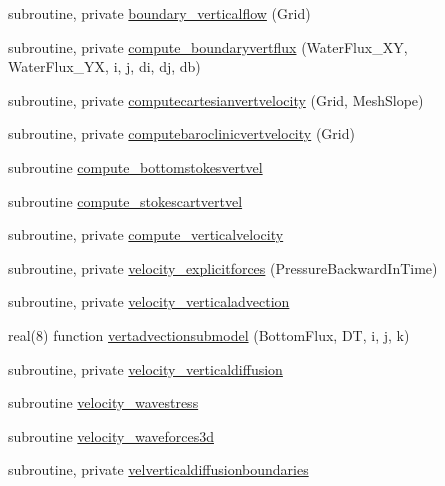 \begin{DoxyCompactItemize}
\item 
subroutine, private \mbox{\hyperlink{namespacemodulehydrodynamic_a08186b721c96e023d8a58a34dc22522f}{boundary\+\_\+verticalflow}} (Grid)
\item 
subroutine, private \mbox{\hyperlink{namespacemodulehydrodynamic_a6bae766b43109e13a0a6976d688327fe}{compute\+\_\+boundaryvertflux}} (Water\+Flux\+\_\+\+XY, Water\+Flux\+\_\+\+YX, i, j, di, dj, db)
\item 
subroutine, private \mbox{\hyperlink{namespacemodulehydrodynamic_a6063cff17a8575e5ea95e38e9a14da2d}{computecartesianvertvelocity}} (Grid, Mesh\+Slope)
\item 
subroutine, private \mbox{\hyperlink{namespacemodulehydrodynamic_a1d49415947b89ef0be84e9bdfbad90a0}{computebaroclinicvertvelocity}} (Grid)
\item 
subroutine \mbox{\hyperlink{namespacemodulehydrodynamic_a7cd2ef8de29d245b1298263b1facaaea}{compute\+\_\+bottomstokesvertvel}}
\item 
subroutine \mbox{\hyperlink{namespacemodulehydrodynamic_abb245df1c1a4f6ca752bd7181e8c61e1}{compute\+\_\+stokescartvertvel}}
\item 
subroutine, private \mbox{\hyperlink{namespacemodulehydrodynamic_aced7b976b91c1f042518042a8b14bad5}{compute\+\_\+verticalvelocity}}
\item 
subroutine, private \mbox{\hyperlink{namespacemodulehydrodynamic_a2789c8c5f9e3e6838c5dda5c13dcd234}{velocity\+\_\+explicitforces}} (Pressure\+Backward\+In\+Time)
\item 
subroutine, private \mbox{\hyperlink{namespacemodulehydrodynamic_ac07b9cc801de5e329ae0bf6d2bc4783b}{velocity\+\_\+verticaladvection}}
\item 
real(8) function \mbox{\hyperlink{namespacemodulehydrodynamic_a514294a37adf9ce3b21a6817c7a86ae1}{vertadvectionsubmodel}} (Bottom\+Flux, DT, i, j, k)
\item 
subroutine, private \mbox{\hyperlink{namespacemodulehydrodynamic_adb227f6b4fa5a958b2dd2061dbfcb22d}{velocity\+\_\+verticaldiffusion}}
\item 
subroutine \mbox{\hyperlink{namespacemodulehydrodynamic_ad5e5fda7c09616794f5a3e2d1a317161}{velocity\+\_\+wavestress}}
\item 
subroutine \mbox{\hyperlink{namespacemodulehydrodynamic_a7cadc35d4f0e4955a2d416039a2a2d18}{velocity\+\_\+waveforces3d}}
\item 
subroutine, private \mbox{\hyperlink{namespacemodulehydrodynamic_a10da15941f53c4274a4bfa5fec56a6ad}{velverticaldiffusionboundaries}}

\end{DoxyCompactItemize}
